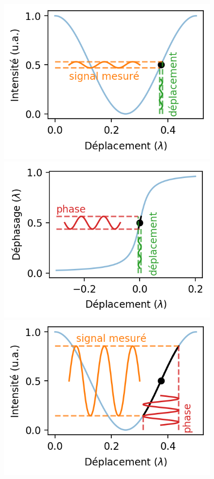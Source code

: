 \documentclass[12pt,a4paper]{article}
\begin{document}
\begin{figure}
\includegraphics[scale=0.75]{figures/michelson_response.png}
\includegraphics[scale=0.75]{figures/cavity_phase_response_ppt.png}
\includegraphics[scale=0.75]{figures/michelson_and_cavity_response.png}

\end{figure}
\end{document}
